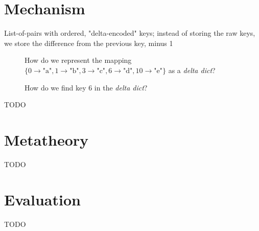 \documentclass[nonacm]{acmart}
\newcommand{\dd}{\emph{delta dict}}
\newcommand{\mapP}{\{0 \rightarrow \text{"a"}, 1 \rightarrow \text{"b"}, 3 \rightarrow \text{"c"}, 6 \rightarrow \text{"d"}, 10 \rightarrow \text{"e"}\}}
\theoremstyle{slplain}
\numberwithin{thm}{section}
\begin{document}
\section{Mechanism}
List-of-pairs with ordered, "delta-encoded" keys;
instead of storing the raw keys, we store
the difference from the previous key, minus 1
\begin{figure}[H]
  \centering
  \caption{How do we represent the mapping $\mapP$ as a \dd?}
  \label{fig:mech1}
\end{figure}
\begin{figure}[H]
  \centering
  \caption{How do we find key $6$ in the \dd?}
  \label{fig:find-6}
\end{figure}

TODO

\section{Metatheory}
TODO

\section{Evaluation}
TODO
\end{document}
